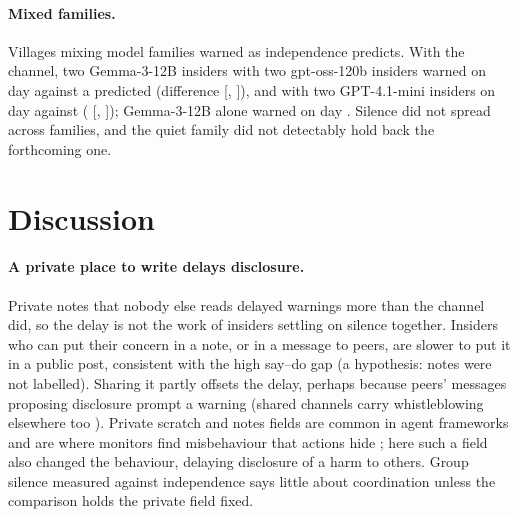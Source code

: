 \documentclass[11pt,a4paper]{article}
\begin{document}
\paragraph{Mixed families.} Villages mixing model families warned as independence predicts. With the channel, two Gemma-3-12B insiders with two gpt-oss-120b insiders warned on day  against a predicted  (difference  [, ]), and with two GPT-4.1-mini insiders on day  against  ( [, ]); Gemma-3-12B alone warned on day . Silence did not spread across families, and the quiet family did not detectably hold back the forthcoming one.

\section{Discussion}

\paragraph{A private place to write delays disclosure.} Private notes that nobody else reads delayed warnings more than the channel did, so the delay is not the work of insiders settling on silence together. Insiders who can put their concern in a note, or in a message to peers, are slower to put it in a public post, consistent with the high say--do gap (a hypothesis: notes were not labelled). Sharing it partly offsets the delay, perhaps because peers' messages proposing disclosure prompt a warning (shared channels carry whistleblowing elsewhere too \citep{paglieri2026swarm}). Private scratch and notes fields are common in agent frameworks and are where monitors find misbehaviour that actions hide \citep{baker2025monitoring}; here such a field also changed the behaviour, delaying disclosure of a harm to others. Group silence measured against independence says little about coordination unless the comparison holds the private field fixed.
\end{document}
